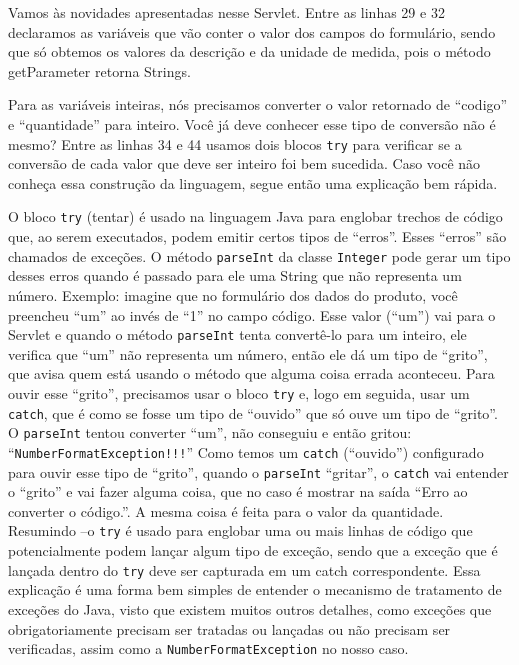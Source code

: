 
Vamos às novidades apresentadas nesse Servlet. Entre as linhas 29 e 32 declaramos as variáveis que vão conter o valor dos campos do formulário, sendo que só obtemos os valores da descrição e da unidade de medida, pois o método getParameter retorna Strings.

Para as variáveis inteiras, nós precisamos converter o valor retornado de ``codigo'' e ``quantidade'' para inteiro. Você já deve conhecer esse tipo de conversão não é mesmo? Entre as linhas 34 e 44 usamos dois blocos \texttt{try} para verificar se a conversão de cada valor que deve ser inteiro foi bem sucedida. Caso você não conheça essa construção da linguagem, segue então uma explicação bem rápida.

O bloco \texttt{try} (tentar) é usado na linguagem Java para englobar trechos de código que, ao serem executados, podem emitir certos tipos de ``erros''. Esses ``erros'' são chamados de exceções. O método \texttt{parseInt} da classe \texttt{Integer} pode gerar um tipo desses erros quando é passado para ele uma String que não representa um número. Exemplo: imagine que no formulário dos dados do produto, você preencheu ``um'' ao invés de ``1'' no campo código. Esse valor (``um'') vai para o Servlet e quando o método \texttt{parseInt} tenta convertê-lo para um inteiro, ele verifica que ``um'' não representa um número, então ele dá um tipo de ``grito'', que avisa quem está usando o método que alguma coisa errada aconteceu. Para ouvir esse ``grito'', precisamos usar o bloco \texttt{try} e, logo em seguida, usar um \texttt{catch}, que é como se fosse um tipo de ``ouvido'' que só ouve um tipo de ``grito''. O \texttt{parseInt} tentou converter ``um'', não conseguiu e então gritou: ``\texttt{NumberFormatException!!!}'' Como temos um \texttt{catch} (``ouvido'') configurado para ouvir esse tipo de ``grito'', quando o \texttt{parseInt} ``gritar'', o \texttt{catch} vai entender o ``grito'' e vai fazer alguma coisa, que no caso é mostrar na saída ``Erro ao converter o código.''. A mesma coisa é feita para o valor da quantidade. Resumindo –o \texttt{try} é usado para englobar uma ou mais linhas de código que potencialmente podem lançar algum tipo de exceção, sendo que a exceção que é lançada dentro do \texttt{try} deve ser capturada em um catch correspondente. Essa explicação é uma forma bem simples de entender o mecanismo de tratamento de exceções do Java, visto que existem muitos outros detalhes, como exceções que obrigatoriamente precisam ser tratadas ou lançadas ou não precisam ser verificadas, assim como a \texttt{NumberFormatException} no nosso caso.

